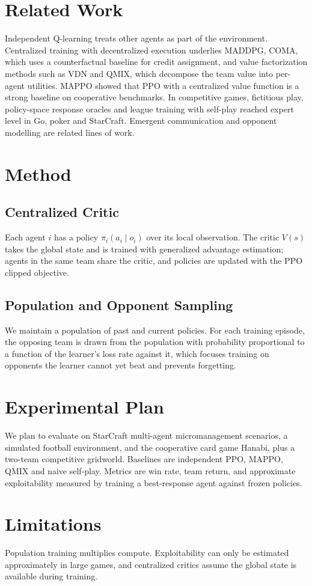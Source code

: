 \documentclass{article}
\begin{document}
\section{Related Work}
Independent Q-learning treats other agents as part of the environment.
Centralized training with decentralized execution underlies MADDPG, COMA, which
uses a counterfactual baseline for credit assignment, and value factorization
methods such as VDN and QMIX, which decompose the team value into per-agent
utilities. MAPPO showed that PPO with a centralized value function is a strong
baseline on cooperative benchmarks. In competitive games, fictitious play,
policy-space response oracles and league training with self-play reached
expert level in Go, poker and StarCraft. Emergent communication and opponent
modelling are related lines of work.

\section{Method}
\subsection{Centralized Critic}
Each agent $i$ has a policy $\pi_i(a_i \mid o_i)$ over its local observation.
The critic $V(s)$ takes the global state and is trained with generalized
advantage estimation; agents in the same team share the critic, and policies
are updated with the PPO clipped objective.

\subsection{Population and Opponent Sampling}
We maintain a population of past and current policies. For each training
episode, the opposing team is drawn from the population with probability
proportional to a function of the learner's loss rate against it, which
focuses training on opponents the learner cannot yet beat and prevents
forgetting.

\section{Experimental Plan}
We plan to evaluate on StarCraft multi-agent micromanagement scenarios, a
simulated football environment, and the cooperative card game Hanabi, plus a
two-team competitive gridworld. Baselines are independent PPO, MAPPO, QMIX and
naive self-play. Metrics are win rate, team return, and approximate
exploitability measured by training a best-response agent against frozen
policies.

\section{Limitations}
Population training multiplies compute. Exploitability can only be estimated
approximately in large games, and centralized critics assume the global state
is available during training.
\end{document}
